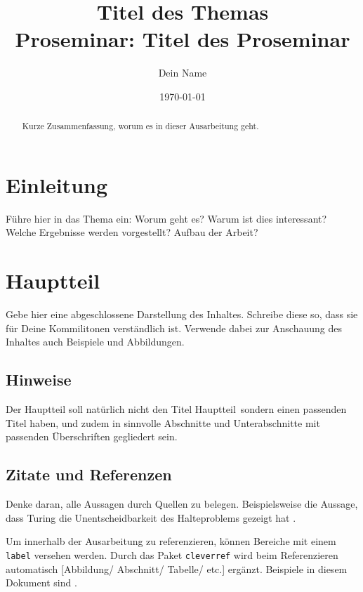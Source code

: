 \documentclass[a4paper,ngerman]{article}
\title{Titel des Themas\\
{\normalsize Proseminar:  Titel des Proseminar}
}
\author{Dein Name}
\date{\today}
\theoremstyle{nonumberplain}
\begin{document}
\maketitle

\linenumbers %
	
\begin{abstract}
	Kurze Zusammenfassung, worum es in dieser Ausarbeitung geht.
\end{abstract}

\section{Einleitung}
\label{sec:intro}

Führe hier in das Thema ein: Worum geht es? Warum ist dies interessant? Welche Ergebnisse werden vorgestellt? Aufbau der Arbeit?

\section{Hauptteil}


Gebe hier eine abgeschlossene Darstellung des Inhaltes. Schreibe diese so, dass sie für Deine Kommilitonen verständlich ist. Verwende dabei zur Anschauung des Inhaltes auch Beispiele und Abbildungen.

\subsection{Hinweise}

Der Hauptteil soll natürlich nicht den Titel \glqq Hauptteil\grqq\ sondern einen passenden Titel haben, und zudem in sinnvolle Abschnitte und Unterabschnitte mit passenden Überschriften gegliedert sein.

\subsection{Zitate und Referenzen}
Denke daran, alle Aussagen durch Quellen zu belegen. Beispielsweise die Aussage, dass Turing die Unentscheidbarkeit des Halteproblems gezeigt hat \cite{Turing1937}.

Um innerhalb der Ausarbeitung zu referenzieren, können Bereiche mit einem \texttt{label} versehen werden. Durch das Paket \texttt{cleverref} wird beim Referenzieren automatisch [Abbildung/ Abschnitt/ Tabelle/ etc.] ergänzt. Beispiele in diesem Dokument sind .
\end{document}
